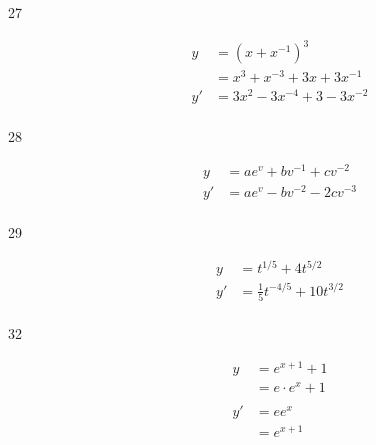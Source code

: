 \documentclass[letterpaper, landscape]{exam}
\begin{document}
\begin{description}
    \item[27] 
      \begin{align*}
        y  & = \left(x + x^{-1} \right)^3 \\
           & = x^3 + x^{-3} + 3x + 3x^{-1} \\
        y' & = \boxed{ 3x^2 - 3x^{-4} + 3 - 3x^{-2} } \\
      \end{align*}

    \item[28] 
      \begin{align*}
        y  & = ae^v + bv^{-1} + cv^{-2} \\
        y' & = \boxed{ ae^v - bv^{-2} - 2cv^{-3} } \\
      \end{align*}

    \item[29] 
      \begin{align*}
        y  & = t^{1/5} + 4t^{5/2} \\
        y' & = \boxed{ \frac{1}{5} t^{-4/5} + 10 t^{3/2} } \\
      \end{align*}



    \item[32] 
      \begin{align*}
        y  & = e^{x + 1} + 1 \\
           & = e \cdot e^x + 1 \\
        \\
        y' & = e e^x \\
           & = \boxed{ e^{x + 1} } \\
      \end{align*}


\end{description}
\end{document}
